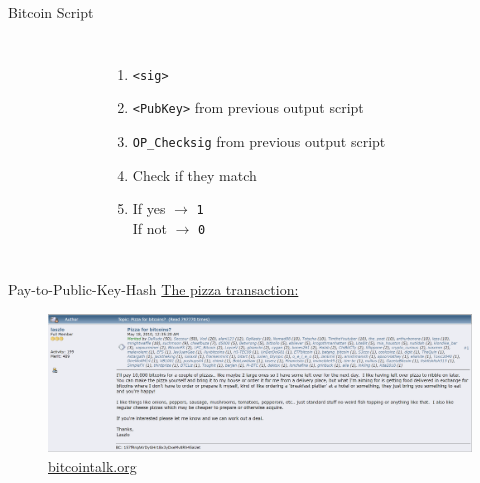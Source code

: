\documentclass[]{beamer}
\begin{document}
\begin{frame}{Bitcoin Script}
\begin{columns}
\begin{figure}
	
\end{figure}

\begin{enumerate}
\item<1-> \texttt{<sig>}
\item<2-> \texttt{<PubKey>} from previous output script
\item<3-> \texttt{OP\_Checksig} from previous output script
\item<4-> Check if they match
\item<5-> If yes $\rightarrow$ \texttt{1} \\ If not $\rightarrow$ \texttt{0} 
\end{enumerate}

\end{columns}
\end{frame}

%

\begin{frame}{Pay-to-Public-Key-Hash}
	\href{https://blockstream.info/tx/a1075db55d416d3ca199f55b6084e2115b9345e16c5cf302fc80e9d5fbf5d48d}{\link The pizza transaction:}\\
	\begin{figure}
	\includegraphics[scale=0.3]{../assets/images/pizza_blogpost}	
	\caption*{\href{https://bitcointalk.org/index.php?topic=137.0}{\link bitcointalk.org}}
	\end{figure}
\end{frame}
\end{document}
